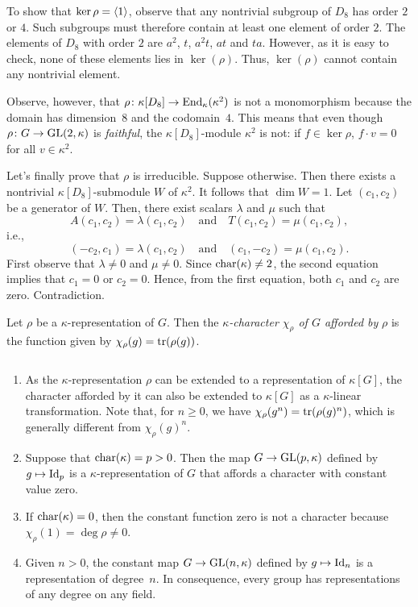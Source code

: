 \begin{xmpl}
    To show that $\ker \rho = \langle1\rangle$, observe that any nontrivial subgroup of $D_8$ has order $2$ or $4$. Such subgroups must therefore contain at least one element of order $2$. The elements of $D_8$ with order $2$ are $a^2$, $t$, $a^2t$, $at$ and $ta$. However, as it is easy to check, none of these elements lies in $\ker(\rho)$. Thus, $\ker(\rho)$ cannot contain any nontrivial element.

    Observe, however, that $\rho\colon\kappa[D_8]\to{\operatorname{End}}_\kappa(\kappa^2)$ is not a monomorphism because the domain has dimension~$8$ and the codomain~$4$. This means that even though $\rho\colon G\to\operatorname{GL}(2,\kappa)$ is \textsl{faithful}, the $\kappa[D_8]$-module $\kappa^2$ is not: if $f\in\ker\rho$, $f\cdot v=0$ for all $v\in\kappa^2$.

    Let's finally prove that $\rho$ is irreducible. Suppose otherwise. Then there exists a nontrivial $\kappa[D_8]$-submodule $W$ of $\kappa^2$. It follows that $\dim W=1$. Let $(c_1,c_2)$ be a generator of $W$. Then, there exist scalars $\lambda$ and $\mu$ such that
    $$
        A(c_1,c_2) = \lambda(c_1,c_2)\quad\text{and}\quad
        T(c_1,c_2) = \mu(c_1,c_2),
    $$
    i.e.,
    $$
        (-c_2,c_1)=\lambda(c_1,c_2)\quad\text{and}\quad
        (c_1,-c_2)=\mu(c_1,c_2).
    $$
    First observe that $\lambda\ne0$ and $\mu\ne0$. Since $\operatorname{char}(\kappa)\ne2$, the second equation implies that $c_1=0$ or $c_2=0$. Hence, from the first equation, both $c_1$ and $c_2$ are zero. Contradiction.
\end{xmpl}

\begin{defn}
    Let $\rho$ be a $\kappa$-representation of $G$. Then the \textsl{$\kappa$-character\/ $\chi_\rho$ of\/ $G$ afforded by\/} $\rho$ is the function given by $\chi_\rho(g) = \operatorname{tr}(\rho(g))$.
\end{defn}

\begin{rems}${}$
    \begin{enumerate}[-]
        \item As the $\kappa$-representation $\rho$ can be extended to a representation of $\kappa[G]$, the character afforded by it can also be extended to $\kappa[G]$ as a $\kappa$-linear transformation. Note that, for $n\ge0$, we have $\chi_\rho(g^n)=\operatorname{tr}(\rho(g)^n)$, which is generally different from $\chi_\rho(g)^n$.

        \item Suppose that $\operatorname{char}(\kappa) = p > 0$. Then the map $G \to\operatorname{GL}(p,\kappa)$ defined by $g\mapsto\operatorname{Id}_p$ is a $\kappa$-representation of $G$ that affords a character with constant value zero.

        \item If $\operatorname{char}(\kappa)=0$, then the constant function zero is not a character because $\chi_\rho(1)=\deg\rho\ne0$.

        \item Given $n>0$, the constant map $G\to\operatorname{GL}(n,\kappa)$ defined by $g\mapsto\operatorname{Id}_n$ is a representation of degree~$n$. In consequence, every group has representations of any degree on any field.
    \end{enumerate}
\end{rems}

